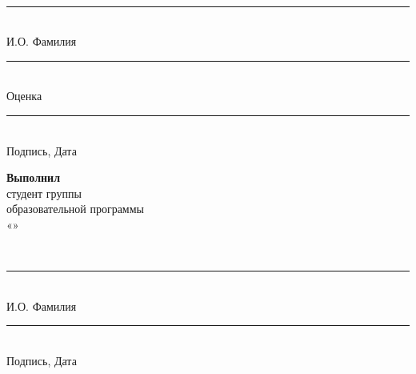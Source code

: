 \begin{titlepage}
\begin{minipage}[t]{0.46\textwidth}
\vspace{0.25cm}
\strut\hseSupervisorName\\[-0.1cm]
\rule{6cm}{0.4pt}\\[-0.1cm]
{\scriptsize И.О. Фамилия}

\vspace{0.25cm}
\rule{6cm}{0.4pt}\\[-0.1cm]
{\scriptsize Оценка}

\vspace{0.25cm}
%
\rule{6cm}{0.4pt}\\[-0.1cm]
{\scriptsize Подпись, Дата}
\end{minipage}
\hfill
\begin{minipage}[t]{0.46\textwidth}
\raggedright
\textbf{Выполнил}\\[0.2cm]
студент группы \hseGroup\\
образовательной программы\\
«\hseSpecialization»

\vspace{0.25cm}
\strut\hseAuthorName\\[-0.1cm]
\rule{6cm}{0.4pt}\\[-0.1cm]
{\scriptsize И.О. Фамилия}

\vspace{0.25cm}
%
\rule{6cm}{0.4pt}\\[-0.1cm]
{\scriptsize Подпись, Дата}
\end{minipage}

\vspace{1.6cm}
\begin{center}
\hseCityYear*[\hseYear]
\end{center}
\end{titlepage}

\setcounter{page}{2}
\clearpage
